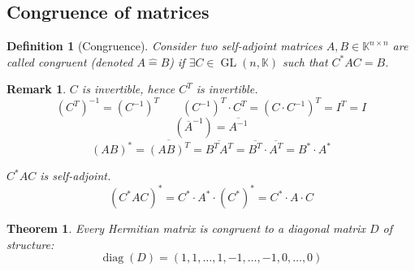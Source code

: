 \documentclass{article}
\newtheorem{theorem}{Theorem}  \numberwithin{theorem}{section}
\newtheorem{definition}{Definition}  \numberwithin{definition}{section}
\newtheorem{remark}{Remark}  \numberwithin{remark}{section}
\begin{document}
\subsection{Congruence of matrices}

\begin{definition}[Congruence] %
  Consider two self-adjoint matrices $A, B \in \mathbb K^{n \times n}$ are called congruent (denoted $A \hat= B$)
  if $\exists C \in \operatorname{GL}(n, \mathbb K)$ such that $C^* AC = B$.
\end{definition}

\begin{remark}
  $C$ is invertible, hence $C^T$ is invertible.
  \[ (C^T)^{-1} = (C^{-1})^T \qquad (C^{-1})^T \cdot C^T = (C \cdot C^{-1})^T = I^T = I \]
  \[ (\overline{A}^{-1}) = \overline{A^{-1}} \]
  \[ (AB)^* = \overline{(AB)^T} = \overline{B^T A^T} = \overline{B^T} \cdot \overline{A^T} = B^* \cdot A^* \]

  $C^* AC$ is self-adjoint.
  \[ (C^* AC)^* = C^* \cdot A^* \cdot (C^*)^* = C^* \cdot A \cdot C \]
\end{remark}

\begin{theorem} %
  Every Hermitian matrix is congruent to a diagonal matrix $D$ of structure:
  \[ \operatorname{diag}(D) = (1, 1, \dots, 1, -1, \dots, -1, 0, \dots, 0) \]
\end{theorem}
\end{document}
